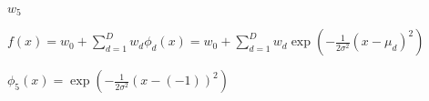 \documentclass[10pt]{article}
\begin{document}
$w_5$


$f(x) = w_0 + \sum_{d=1}^D w_d \phi_d(x) = w_0 + \sum_{d=1}^D w_d \exp(-\frac{1}{2\sigma^2} (x - \mu_d)^2)$

$\phi_5(x) =  \exp(-\frac{1}{2\sigma^2} (x - (-1))^2)$
\end{document}
